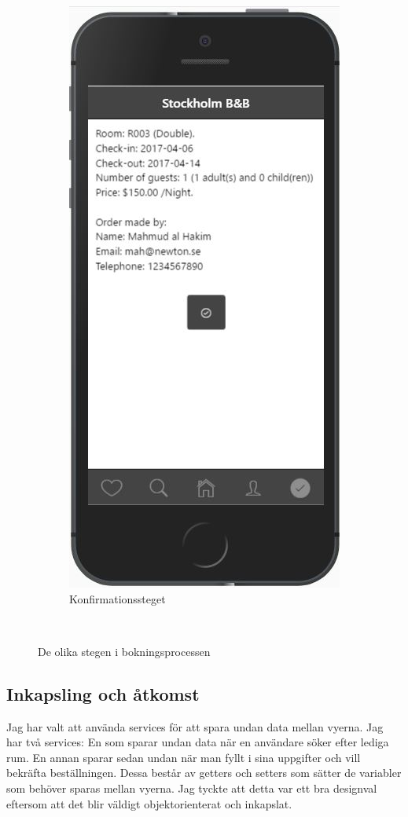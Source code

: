 \documentclass[a4paper]{article}
\begin{document}
\begin{figure}
\begin{subfigure}{.3\textwidth}
  \includegraphics[width=.8\linewidth]{confirming.jpg}
  \caption{Konfirmationssteget}
  \label{fig:sfig6}
\end{subfigure}\\
\caption{De olika stegen i bokningsprocessen}
\label{fig:fig}
\end{figure}
\subsection{Inkapsling och åtkomst}
\label{encapsel}
Jag har valt att använda services för att spara undan data mellan vyerna. Jag har två services: En som sparar undan data när en användare söker efter lediga rum. En annan sparar sedan undan när man fyllt i sina uppgifter och vill bekräfta beställningen. Dessa består av getters och setters som sätter de variabler som behöver sparas mellan vyerna. Jag tyckte att detta var ett bra designval eftersom att det blir väldigt objektorienterat och inkapslat. \cite{exampleService}
\end{document}
